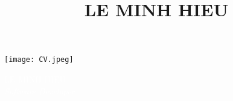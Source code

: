 \documentclass[11pt,oneside,a4paper]{article}
\title{LE MINH HIEU}
\date{}
\begin{document}

\begin{tcolorbox}
    \begin{minipage}{4.5cm}
        \hspace*{-0.3cm}\texttt{[image: CV.jpeg]}
    \end{minipage}
    \begin{minipage}{15cm}
        \begin{center}
            \Huge{\textcolor{white}{LE MINH HIEU}} \\
            \vspace*{0.5cm}
            \Large{\textcolor{white}{\textit{Software Developer}}}
        \end{center}
    \end{minipage}
\end{tcolorbox}
\end{document}
